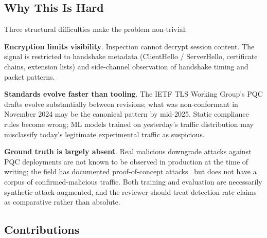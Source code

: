 \documentclass[sigconf,nonacm]{acmart}
\begin{document}
\subsection{Why This Is Hard}

Three structural difficulties make the problem non-trivial:

\textbf{Encryption limits visibility}. Inspection cannot decrypt
session content. The signal is restricted to handshake metadata
(ClientHello / ServerHello, certificate chains, extension lists)
and side-channel observation of handshake timing and packet
patterns.

\textbf{Standards evolve faster than tooling}. The IETF TLS Working
Group's PQC drafts evolve substantially between revisions; what
was non-conformant in November 2024 may be the canonical pattern
by mid-2025. Static compliance rules become wrong; ML models
trained on yesterday's traffic distribution may misclassify today's
legitimate experimental traffic as suspicious.

\textbf{Ground truth is largely absent}. Real malicious downgrade
attacks against PQC deployments are not known to be observed in
production at the time of writing; the field has documented
proof-of-concept attacks~\cite{guneysu2024downgrade,celi2024hybrid}
but does not have a corpus of confirmed-malicious traffic. Both
training and evaluation are necessarily synthetic-attack-augmented,
and the reviewer should treat detection-rate claims as comparative
rather than absolute.

\subsection{Contributions}
\end{document}
